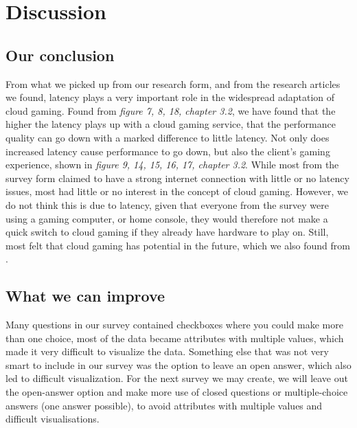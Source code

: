 \section{Discussion}

\subsection{Our conclusion}
From what we picked up from our research form, and from the research articles we found, latency plays a very important role in the widespread adaptation of cloud gaming. Found from \textit{figure 7, 8, 18, chapter 3.2}, we have found that the higher the latency plays up with a cloud gaming service, that the performance quality can go down with a marked difference to little latency. Not only does increased latency cause performance to go down, but also the client's gaming experience, shown in \textit{figure 9, 14, 15, 16, 17, chapter 3.2}. While most from the survey form claimed to have a strong internet connection with little or no latency issues, most had little or no interest in the concept of cloud gaming. However, we do not think this is due to latency, given that everyone from the survey were using a gaming computer, or home console, they would therefore not make a quick switch to cloud gaming if they already have hardware to play on. Still, most felt that cloud gaming has potential in the future, which we also found from \parencite[Chapter VI]{7536162}.\\

\subsection{What we can improve}
Many questions in our survey contained checkboxes where you could make more than one choice, most of the data became attributes with multiple values, which made it very difficult to visualize the data. Something else that was not very smart to include in our survey was the option to leave an open answer, which also led to difficult visualization. For the next survey we may create, we will leave out the open-answer option and make more use of closed questions or multiple-choice answers (one answer possible), to avoid attributes with multiple values and difficult visualisations.